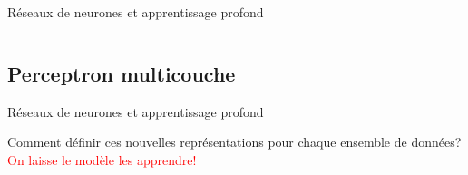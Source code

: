 \documentclass[french]{beamer}
\begin{document}
\begin{frame}{Réseaux de neurones et apprentissage profond}
\begin{columns}[T]
\begin{column}{.3\textwidth}
\begin{center}
\end{center}
\end{column}
\hfill
\end{columns}
\end{frame}


\subsection{Perceptron multicouche}

\begin{frame}{Réseaux de neurones et apprentissage profond}
\begin{center}
{\Large Comment définir ces nouvelles représentations pour chaque ensemble de données?} \\
\pause
\vspace{1cm}
{\Large{\textcolor{red}{On laisse le modèle les apprendre!}}}
\end{center}
\end{frame}
\end{document}
